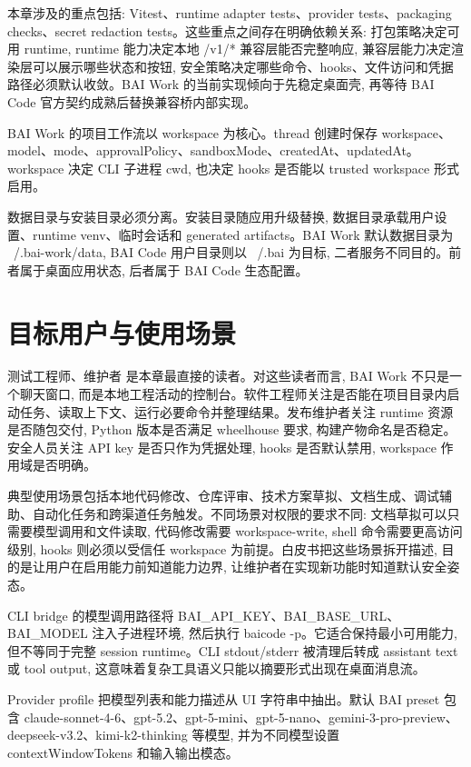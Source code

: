 本章涉及的重点包括: Vitest、runtime adapter tests、provider tests、packaging checks、secret redaction tests。这些重点之间存在明确依赖关系: 打包策略决定可用 runtime, runtime 能力决定本地 /v1/* 兼容层能否完整响应, 兼容层能力决定渲染层可以展示哪些状态和按钮, 安全策略决定哪些命令、hooks、文件访问和凭据路径必须默认收敛。BAI Work 的当前实现倾向于先稳定桌面壳, 再等待 BAI Code 官方契约成熟后替换兼容桥内部实现。

BAI Work 的项目工作流以 workspace 为核心。thread 创建时保存 workspace、model、mode、approvalPolicy、sandboxMode、createdAt、updatedAt。workspace 决定 CLI 子进程 cwd, 也决定 hooks 是否能以 trusted workspace 形式启用。

数据目录与安装目录必须分离。安装目录随应用升级替换, 数据目录承载用户设置、runtime venv、临时会话和 generated artifacts。BAI Work 默认数据目录为 ~/.bai-work/data, BAI Code 用户目录则以 ~/.bai 为目标, 二者服务不同目的。前者属于桌面应用状态, 后者属于 BAI Code 生态配置。

\section{目标用户与使用场景}
测试工程师、维护者 是本章最直接的读者。对这些读者而言, BAI Work 不只是一个聊天窗口, 而是本地工程活动的控制台。软件工程师关注是否能在项目目录内启动任务、读取上下文、运行必要命令并整理结果。发布维护者关注 runtime 资源是否随包交付, Python 版本是否满足 wheelhouse 要求, 构建产物命名是否稳定。安全人员关注 API key 是否只作为凭据处理, hooks 是否默认禁用, workspace 作用域是否明确。

典型使用场景包括本地代码修改、仓库评审、技术方案草拟、文档生成、调试辅助、自动化任务和跨渠道任务触发。不同场景对权限的要求不同: 文档草拟可以只需要模型调用和文件读取, 代码修改需要 workspace-write, shell 命令需要更高访问级别, hooks 则必须以受信任 workspace 为前提。白皮书把这些场景拆开描述, 目的是让用户在启用能力前知道能力边界, 让维护者在实现新功能时知道默认安全姿态。

CLI bridge 的模型调用路径将 BAI\_API\_KEY、BAI\_BASE\_URL、BAI\_MODEL 注入子进程环境, 然后执行 baicode -p。它适合保持最小可用能力, 但不等同于完整 session runtime。CLI stdout/stderr 被清理后转成 assistant text 或 tool output, 这意味着复杂工具语义只能以摘要形式出现在桌面消息流。

Provider profile 把模型列表和能力描述从 UI 字符串中抽出。默认 BAI preset 包含 claude-sonnet-4-6、gpt-5.2、gpt-5-mini、gpt-5-nano、gemini-3-pro-preview、deepseek-v3.2、kimi-k2-thinking 等模型, 并为不同模型设置 contextWindowTokens 和输入输出模态。

